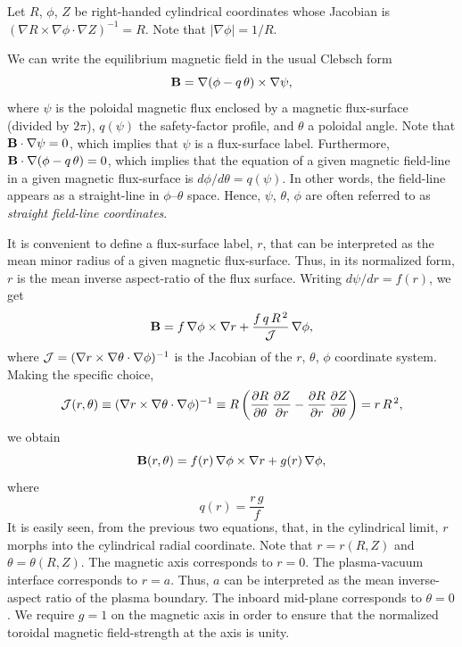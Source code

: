\documentclass[12pt,prb,aps]{revtex4-1}
\begin{document}
Let $R$, $\phi$, $Z$ be right-handed cylindrical coordinates whose Jacobian 
is
$(\nabla R\times \nabla\phi\cdot\nabla Z)^{-1} = R$. 
Note that $|\nabla\phi|=1/R$. 

We can write the equilibrium magnetic field in the usual Clebsch form\,\cite{boozer}
\begin{equation}
{\bf B}= \nabla(\phi-q\,\theta)\times\nabla\psi,
\end{equation}
where $\psi$ is the poloidal magnetic flux enclosed by a magnetic flux-surface (divided by $2\pi$), $q(\psi)$ the safety-factor profile, and
$\theta$  a poloidal angle. Note that ${\bf B}\cdot\nabla\psi=0$, which implies that $\psi$ is a flux-surface label. Furthermore, ${\bf B}\cdot\nabla(\phi-q\,\theta)=0$, which implies that the equation of a given magnetic field-line in a given magnetic flux-surface is $d\phi/d\theta = q(\psi)$. In other words, the
field-line appears as a straight-line in $\phi$--$\theta$ space. Hence, $\psi$, $\theta$, $\phi$ are often referred to as {\em straight field-line coordinates}. 

It is convenient to define a flux-surface label, $r$, that can be interpreted as the mean minor radius of a given magnetic flux-surface. Thus,
in its normalized form, $r$ is the mean inverse aspect-ratio of the flux surface. Writing $d\psi/dr=f(r)$, we get
\begin{equation}
{\bf B} =f\,\nabla\phi\times\nabla r + \frac{f\,q\,R^{\,2}}{{\cal J}}\,\nabla\phi,
\end{equation}
where ${\cal J}= (\nabla r\times\nabla\theta\cdot\nabla\phi)^{-1}$ is the Jacobian of the $r$, $\theta$, $\phi$ coordinate system. 
Making the specific choice,\cite{bussac,connor}
\begin{equation}\label{jac}
{\cal J}(r,\theta)\equiv (\nabla r\times \nabla\theta\cdot\nabla\phi)^{-1} \equiv R\left(\frac{\partial R}{\partial\theta}\,\frac{\partial Z}{\partial r} -\frac{\partial R}{\partial r}\,\frac{\partial Z}{\partial \theta}\right)= r\,R^{\,2},
\end{equation}
we obtain
\begin{equation}\label{bfield}
{\bf B}(r,\theta) = f(r)\,\nabla\phi\times \nabla r + g(r)\,\nabla\phi,
\end{equation}
where
\begin{equation}\label{q}
q(r) = \frac{r\,g}{f}
\end{equation}
It is easily seen, from the previous two equations, that, in the cylindrical limit, $r$ morphs into the cylindrical
radial coordinate. 
Note that $r=r(R,Z)$ and $\theta=\theta(R,Z)$. 
The magnetic axis corresponds to $r=0$. The plasma-vacuum interface corresponds to $r=a$. Thus, $a$ can be interpreted as the
mean inverse-aspect ratio of the plasma boundary. The inboard mid-plane corresponds to $\theta=0$. 
We require $g=1$ on the magnetic axis in order to ensure that the normalized toroidal magnetic field-strength at the  axis is unity.  
\end{document}
